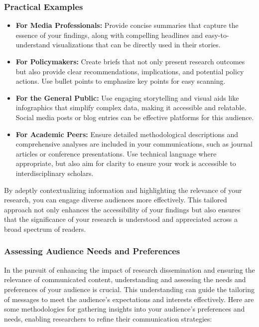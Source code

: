 \documentclass[
]{book}
\providecommand{\tightlist}{%
  \setlength{\itemsep}{0pt}\setlength{\parskip}{0pt}}
\begin{document}
\hypertarget{practical-examples}{%
\subsubsection*{Practical Examples}\label{practical-examples}}

\begin{itemize}
\tightlist
\item
  \textbf{For Media Professionals:} Provide concise summaries that capture the essence of your findings, along with compelling headlines and easy-to-understand visualizations that can be directly used in their stories.
\item
  \textbf{For Policymakers:} Create briefs that not only present research outcomes but also provide clear recommendations, implications, and potential policy actions. Use bullet points to emphasize key points for easy scanning.
\item
  \textbf{For the General Public:} Use engaging storytelling and visual aids like infographics that simplify complex data, making it accessible and relatable. Social media posts or blog entries can be effective platforms for this audience.
\item
  \textbf{For Academic Peers:} Ensure detailed methodological descriptions and comprehensive analyses are included in your communications, such as journal articles or conference presentations. Use technical language where appropriate, but also aim for clarity to ensure your work is accessible to interdisciplinary scholars.
\end{itemize}

By adeptly contextualizing information and highlighting the relevance of your research, you can engage diverse audiences more effectively. This tailored approach not only enhances the accessibility of your findings but also ensures that the significance of your research is understood and appreciated across a broad spectrum of readers.

\hypertarget{assessing-audience-needs-and-preferences-1}{%
\subsubsection*{Assessing Audience Needs and Preferences}\label{assessing-audience-needs-and-preferences-1}}

In the pursuit of enhancing the impact of research dissemination and ensuring the relevance of communicated content, understanding and assessing the needs and preferences of your audience is crucial. This understanding can guide the tailoring of messages to meet the audience's expectations and interests effectively. Here are some methodologies for gathering insights into your audience's preferences and needs, enabling researchers to refine their communication strategies:
\end{document}
